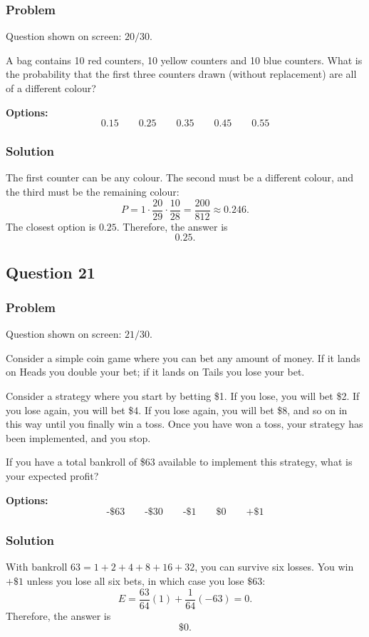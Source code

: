 \documentclass[12pt]{article}
\begin{document}
\subsubsection{Problem}
Question shown on screen: \(20/30\).

A bag contains 10 red counters, 10 yellow counters and 10 blue counters. What is the probability that the first three counters drawn (without replacement) are all of a different colour?

\noindent\textbf{Options:}
\[
\boxed{0.15}
\qquad
\boxed{0.25}
\qquad
\boxed{0.35}
\qquad
\boxed{0.45}
\qquad
\boxed{0.55}
\]

\subsubsection{Solution}
The first counter can be any colour. The second must be a different colour, and the third must be the remaining colour:
\[
P=1\cdot \frac{20}{29}\cdot \frac{10}{28}
=\frac{200}{812}\approx 0.246.
\]
The closest option is \(0.25\). Therefore, the answer is
\[
\boxed{0.25}.
\]

\subsection{Question 21}
\subsubsection{Problem}
Question shown on screen: \(21/30\).

Consider a simple coin game where you can bet any amount of money. If it lands on Heads you double your bet; if it lands on Tails you lose your bet.

Consider a strategy where you start by betting \$1. If you lose, you will bet \$2. If you lose again, you will bet \$4. If you lose again, you will bet \$8, and so on in this way until you finally win a toss. Once you have won a toss, your strategy has been implemented, and you stop.

If you have a total bankroll of \$63 available to implement this strategy, what is your expected profit?

\noindent\textbf{Options:}
\[
\boxed{\text{-\$63}}
\qquad
\boxed{\text{-\$30}}
\qquad
\boxed{\text{-\$1}}
\qquad
\boxed{\text{\$0}}
\qquad
\boxed{\text{+\$1}}
\]

\subsubsection{Solution}
With bankroll \(63=1+2+4+8+16+32\), you can survive six losses. You win \(+\$1\) unless you lose all six bets, in which case you lose \(\$63\):
\[
E=\frac{63}{64}(1)+\frac{1}{64}(-63)=0.
\]
Therefore, the answer is
\[
\boxed{\text{\$0}}.
\]
\end{document}
